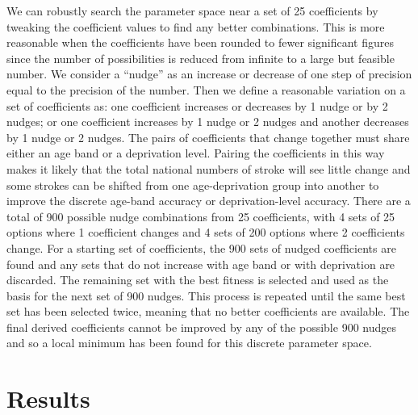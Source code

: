 \documentclass[12pt]{extarticle}
\begin{document}
We can robustly search the parameter space near a set of 25 coefficients by tweaking the coefficient values to find any better combinations.
This is more reasonable when the coefficients have been rounded to fewer significant figures since the number of possibilities is reduced from infinite to a large but feasible number.
% 
We consider a ``nudge'' as an increase or decrease of one step of precision equal to the precision of the number.
% 
Then we define a reasonable variation on a set of coefficients as: one coefficient increases or decreases by 1 nudge or by 2 nudges; or one coefficient increases by 1 nudge or 2 nudges and another decreases by 1 nudge or 2 nudges.
The pairs of coefficients that change together must share either an age band or a deprivation level.
% 
Pairing the coefficients in this way makes it likely that the total national numbers of stroke will see little change and some strokes can be shifted from one age-deprivation group into another to improve the discrete age-band accuracy or deprivation-level accuracy.
There are a total of 900 possible nudge combinations from 25 coefficients, with 4 sets of 25 options where 1 coefficient changes and 4 sets of 200 options where 2 coefficients change.
% 
For a starting set of coefficients, the 900 sets of nudged coefficients are found and any sets that do not increase with age band or with deprivation are discarded.
The remaining set with the best fitness is selected and used as the basis for the next set of 900 nudges.
This process is repeated until the same best set has been selected twice, meaning that no better coefficients are available.
% 
The final derived coefficients cannot be improved by any of the possible 900 nudges and so a local minimum has been found for this discrete parameter space.


\section{Results}
\end{document}
